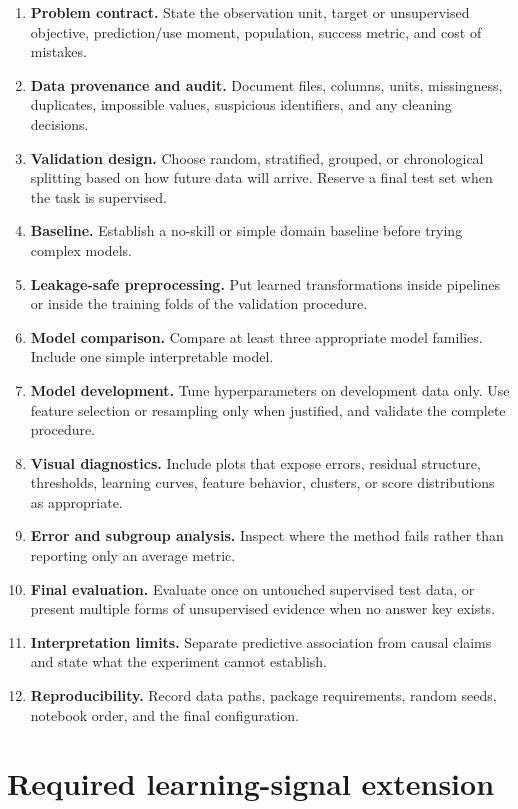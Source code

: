 \begin{enumerate}
  \item \textbf{Problem contract.} State the observation unit, target or unsupervised objective, prediction/use moment, population, success metric, and cost of mistakes.
  \item \textbf{Data provenance and audit.} Document files, columns, units, missingness, duplicates, impossible values, suspicious identifiers, and any cleaning decisions.
  \item \textbf{Validation design.} Choose random, stratified, grouped, or chronological splitting based on how future data will arrive. Reserve a final test set when the task is supervised.
  \item \textbf{Baseline.} Establish a no-skill or simple domain baseline before trying complex models.
  \item \textbf{Leakage-safe preprocessing.} Put learned transformations inside pipelines or inside the training folds of the validation procedure.
  \item \textbf{Model comparison.} Compare at least three appropriate model families. Include one simple interpretable model.
  \item \textbf{Model development.} Tune hyperparameters on development data only. Use feature selection or resampling only when justified, and validate the complete procedure.
  \item \textbf{Visual diagnostics.} Include plots that expose errors, residual structure, thresholds, learning curves, feature behavior, clusters, or score distributions as appropriate.
  \item \textbf{Error and subgroup analysis.} Inspect where the method fails rather than reporting only an average metric.
  \item \textbf{Final evaluation.} Evaluate once on untouched supervised test data, or present multiple forms of unsupervised evidence when no answer key exists.
  \item \textbf{Interpretation limits.} Separate predictive association from causal claims and state what the experiment cannot establish.
  \item \textbf{Reproducibility.} Record data paths, package requirements, random seeds, notebook order, and the final configuration.
\end{enumerate}

\section*{Required learning-signal extension}

